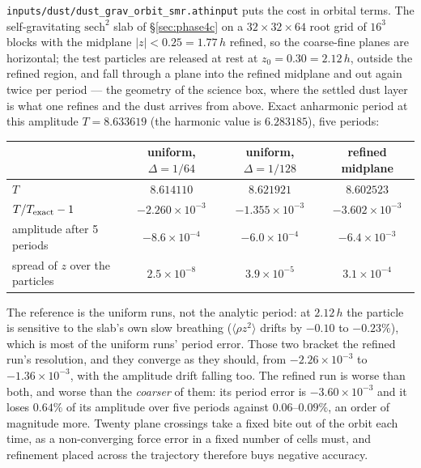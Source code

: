 \documentclass[11pt]{article}
\newcommand{\file}[1]{\texttt{#1}}
\begin{document}
\file{inputs/dust/dust\_grav\_orbit\_smr.athinput} puts the cost in orbital terms.
The self-gravitating $\mathrm{sech}^2$ slab of \S\ref{sec:phase4c} on a
$32\times32\times64$ root grid of $16^3$ blocks with the midplane $|z| < 0.25 = 1.77\,h$
refined, so the coarse-fine planes are horizontal; the test particles are released at rest
at $z_0 = 0.30 = 2.12\,h$, outside the refined region, and fall through a plane into the
refined midplane and out again twice per period --- the geometry of the science box, where
the settled dust layer is what one refines and the dust arrives from above. Exact
anharmonic period at this amplitude $T = 8.633619$ (the harmonic value is $6.283185$),
five periods:

\begin{center}
\small
\begin{tabular}{@{}lccc@{}}
\toprule
 & uniform, $\Delta = 1/64$ & uniform, $\Delta = 1/128$ & refined midplane \\
\midrule
$T$                              & $8.614110$ & $8.621921$ & $8.602523$ \\
$T/T_{\rm exact} - 1$            & $-2.260\times10^{-3}$ & $-1.355\times10^{-3}$
                                                          & $-3.602\times10^{-3}$ \\
amplitude after 5 periods        & $-8.6\times10^{-4}$ & $-6.0\times10^{-4}$
                                                       & $-6.4\times10^{-3}$ \\
spread of $z$ over the particles & $2.5\times10^{-8}$ & $3.9\times10^{-5}$
                                                      & $3.1\times10^{-4}$ \\
\bottomrule
\end{tabular}
\end{center}

The reference is the uniform runs, not the analytic period: at $2.12\,h$ the particle is
sensitive to the slab's own slow breathing ($\langle\rho z^2\rangle$ drifts by
$-0.10$ to $-0.23\%$), which is most of the uniform runs' period error. Those two
bracket the refined run's resolution, and they converge as they should, from
$-2.26\times10^{-3}$ to $-1.36\times10^{-3}$, with the amplitude drift falling too. The
refined run is worse than both, and worse than the \emph{coarser} of them: its period
error is $-3.60\times10^{-3}$ and it loses $0.64\%$ of its amplitude over five periods
against $0.06$--$0.09\%$, an order of magnitude more. Twenty plane crossings take a fixed
bite out of the orbit each time, as a non-converging force error in a fixed number of
cells must, and refinement placed across the trajectory therefore buys negative accuracy.
\end{document}
